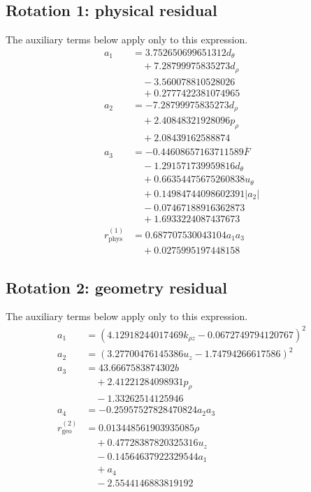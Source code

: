 \subsection*{Rotation 1: physical residual}
The auxiliary terms below apply only to this expression.
\begin{align*}
a_{1} &= 3.752650699651312 d_\theta \\
&\quad + 7.28799975835273 d_\rho \\
&\quad - 3.560078810528026 \\
&\quad + 0.2777422381074965 \\
a_{2} &= - 7.28799975835273 d_\rho \\
&\quad + 2.40848321928096 p_\rho \\
&\quad + 2.08439162588874 \\
a_{3} &= - 0.44608657163711589 \overline{F} \\
&\quad - 1.291571739959816 d_\theta \\
&\quad + 0.66354475675260838 u_\theta \\
&\quad + 0.14984744098602391 \left|{a_{2}}\right| \\
&\quad - 0.07467188916362873 \\
&\quad + 1.6933224087437673 \\
r_{\mathrm{phys}}^{(1)} &= 0.687707530043104 a_{1} a_{3} \\
&\quad + 0.0275995197448158
\end{align*}

\subsection*{Rotation 2: geometry residual}
The auxiliary terms below apply only to this expression.
\begin{align*}
a_{1} &= \left(4.12918244017469 k_{\rho z} - 0.0672749794120767\right)^{2} \\
a_{2} &= \left(3.27700476145386 u_z - 1.74794266617586\right)^{2} \\
a_{3} &= 43.6667583874302 b \\
&\quad + 2.41221284098931 p_\rho \\
&\quad - 1.33262514125946 \\
a_{4} &= - 0.25957527828470824 a_{2} a_{3} \\
r_{\mathrm{geo}}^{(2)} &= 0.013448561903935085 \rho \\
&\quad + 0.47728387820325316 u_z \\
&\quad - 0.14564637922329544 a_{1} \\
&\quad + a_{4} \\
&\quad - 2.5544146883819192
\end{align*}

